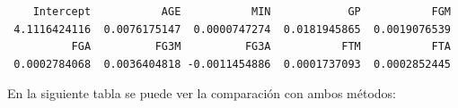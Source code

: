 \documentclass[
  letterpaper,
  DIV=11,
  numbers=noendperiod]{scrartcl}
\newenvironment{Shaded}{\begin{snugshade}}{\end{snugshade}}
\newcommand{\AttributeTok}[1]{\textcolor[rgb]{0.40,0.45,0.13}{#1}}
\newcommand{\DecValTok}[1]{\textcolor[rgb]{0.68,0.00,0.00}{#1}}
\newcommand{\FunctionTok}[1]{\textcolor[rgb]{0.28,0.35,0.67}{#1}}
\newcommand{\NormalTok}[1]{\textcolor[rgb]{0.00,0.23,0.31}{#1}}
\newcommand{\OtherTok}[1]{\textcolor[rgb]{0.00,0.23,0.31}{#1}}
\newcommand{\SpecialCharTok}[1]{\textcolor[rgb]{0.37,0.37,0.37}{#1}}
\newcommand{\StringTok}[1]{\textcolor[rgb]{0.13,0.47,0.30}{#1}}
\begin{document}
\begin{Shaded}
\end{Shaded}

\begin{verbatim}
    Intercept           AGE           MIN            GP           FGM 
 4.1116424116  0.0076175147  0.0000747274  0.0181945865  0.0019076539 
          FGA          FG3M          FG3A           FTM           FTA 
 0.0002784068  0.0036404818 -0.0011454886  0.0001737093  0.0002852445 
\end{verbatim}

En la siguiente tabla se puede ver la comparación con ambos métodos:
\end{document}
